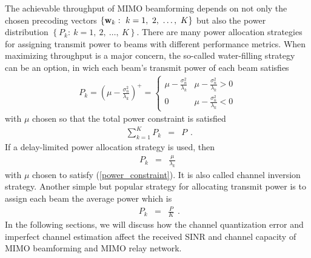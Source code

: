 \documentclass[10pt,fleqn, twocolumn]{IEEEtran}
\newcommand{\bw}{{\bf w}}
\begin{document}
The achievable throughput of MIMO beamforming depends on not only
the chosen precoding vectors $\left\{\bw_{k}:\ k=1,\ 2,\ \ldots,\
K\right\}$ but also the power distribution $\left\{P_{k}:\ k=1,\
2,\ \ldots,\ K\right\}$. There are many power allocation
strategies for assigning transmit power to beams with different
performance metrics. When maximizing throughput is a major
concern, the so-called water-filling strategy can be an option, in
wich each beam's transmit power of each beam satisfies
\begin{equation}
\begin{array}{l}
P_{k}=\left(\mu-\frac{\sigma_{n}^2}{\lambda_{k}}\right)^{+}=
\begin{cases}
\mu-\frac{\sigma_{n}^2}{\lambda_{k}} & \mu-\frac{\sigma_{n}^2}{\lambda_{k}} >0 \\
0 & \mu-\frac{\sigma_{n}^2}{\lambda_{k}} < 0
\end{cases}
\end{array}
\end{equation}
\noindent with $\mu$ chosen so that the total power constraint is
satisfied
\begin{equation}
\begin{array}{rcl}
\sum\limits_{k=1}^{K}P_{k}&=&P
\end{array}.\label{power_constraint}
\end{equation}
\noindent If a delay-limited power allocation strategy is used,
then
\begin{equation}
\begin{array}{rcl}
P_{k}&=&\frac{\mu}{\lambda_{k}}
\end{array}
\end{equation}
with $\mu$ chosen to satisfy (\ref{power_constraint}). It is also
called channel inversion strategy. Another simple but popular
strategy for allocating transmit power is to assign each beam the
average power which is
\begin{equation}
\begin{array}{rcl}
P_{k}&=&\frac{P}{K}
\end{array}.\label{P_aver}
\end{equation}
In the following sections, we will discuss how the channel
quantization error and imperfect channel estimation affect the
received SINR and channel capacity of MIMO beamforming and MIMO
relay network.
\end{document}

